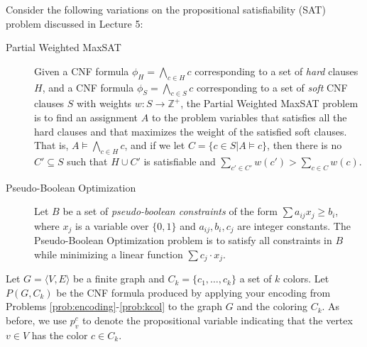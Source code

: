 \documentclass{article}
\begin{document}
Consider the following variations on the propositional satisfiability (SAT) problem discussed in Lecture 5:

\begin{description}
	
	\item[Partial Weighted MaxSAT] Given a CNF formula $\phi_H = \bigwedge_{c \in H} c$ corresponding to a set of \emph{hard} clauses $H$, and a CNF formula $\phi_S = \bigwedge_{c \in S} c$ corresponding to a set of \emph{soft} CNF clauses $S$ with weights $w : S \rightarrow \mathbb{Z^+}$, the Partial Weighted MaxSAT problem is to find an assignment $A$ to the problem variables that satisfies all the hard clauses and that maximizes the weight of the satisfied soft clauses. That is, $A \models \bigwedge_{c \in H} c$, and if we let $C = \{ c\in S | A\models c\}$, then there is no $C'\subseteq S$ such that $H\cup C'$ is satisfiable and $\sum_{c'\in C'} w(c') > \sum_{c\in C} w(c)$.
	
	\item[Pseudo-Boolean Optimization]  Let $B$ be a set of \emph{pseudo-boolean constraints} of the form $\sum a_{ij}x_j \geq b_i$, where $x_j$ is a variable over $\{0, 1\}$ and $a_{ij}, b_i, c_j$ are integer constants.  The Pseudo-Boolean Optimization problem is to satisfy all constraints in $B$ while minimizing a linear function $\sum c_j \cdot x_j$.
\end{description}
%

Let $G = \langle V, E\rangle$ be a finite graph and $C_k = \{ c_1, \ldots, c_k \}$ a set of $k$ colors. 
Let $P(G, C_k)$ be the CNF formula produced by applying your encoding from Problems \ref{prob:encoding}-\ref{prob:kcol}  
to the graph $G$ and the coloring $C_k$. 
As before, we use $p_v^c$ to denote the propositional variable indicating that the vertex $v\in V$ has the color $c\in C_k$.
\end{document}
